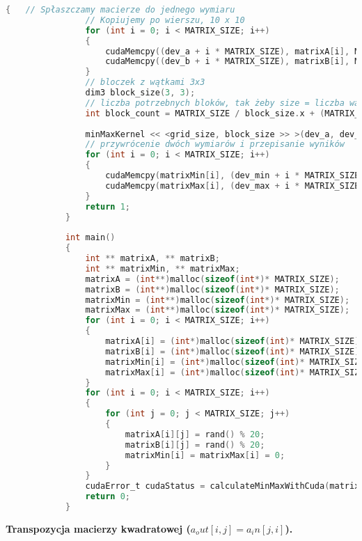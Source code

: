 			\begin{lstlisting}[language=C]
			{	// Spłaszczamy macierze do jednego wymiaru
				// Kopiujemy po wierszu, 10 x 10
				for (int i = 0; i < MATRIX_SIZE; i++)
				{
					cudaMemcpy((dev_a + i * MATRIX_SIZE), matrixA[i], MATRIX_SIZE * sizeof(int), cudaMemcpyHostToDevice);
					cudaMemcpy((dev_b + i * MATRIX_SIZE), matrixB[i], MATRIX_SIZE * sizeof(int), cudaMemcpyHostToDevice);
				}
				// bloczek z wątkami 3x3
				dim3 block_size(3, 3);
				// liczba potrzebnych bloków, tak żeby size = liczba wątków
				int block_count = MATRIX_SIZE / block_size.x + (MATRIX_SIZE % block_size.x == 0 ? 0 : 1);
				
				minMaxKernel << <grid_size, block_size >> >(dev_a, dev_b, dev_min, dev_max);
				// przywrócenie dwóch wymiarów i przepisanie wyników
				for (int i = 0; i < MATRIX_SIZE; i++)
				{
					cudaMemcpy(matrixMin[i], (dev_min + i * MATRIX_SIZE), MATRIX_SIZE * sizeof(int), cudaMemcpyDeviceToHost);
					cudaMemcpy(matrixMax[i], (dev_max + i * MATRIX_SIZE), MATRIX_SIZE * sizeof(int), cudaMemcpyDeviceToHost);
				}
				return 1;
			}
			
			int main()
			{
				int ** matrixA, ** matrixB;
				int ** matrixMin, ** matrixMax;
				matrixA = (int**)malloc(sizeof(int*)* MATRIX_SIZE);
				matrixB = (int**)malloc(sizeof(int*)* MATRIX_SIZE);
				matrixMin = (int**)malloc(sizeof(int*)* MATRIX_SIZE);
				matrixMax = (int**)malloc(sizeof(int*)* MATRIX_SIZE);
				for (int i = 0; i < MATRIX_SIZE; i++)
				{
					matrixA[i] = (int*)malloc(sizeof(int)* MATRIX_SIZE);
					matrixB[i] = (int*)malloc(sizeof(int)* MATRIX_SIZE);
					matrixMin[i] = (int*)malloc(sizeof(int)* MATRIX_SIZE);
					matrixMax[i] = (int*)malloc(sizeof(int)* MATRIX_SIZE);
				}
				for (int i = 0; i < MATRIX_SIZE; i++)
				{
					for (int j = 0; j < MATRIX_SIZE; j++)
					{
						matrixA[i][j] = rand() % 20;
						matrixB[i][j] = rand() % 20;
						matrixMin[i] = matrixMax[i] = 0;
					}
				}
				cudaError_t cudaStatus = calculateMinMaxWithCuda(matrixA, matrixB, matrixMin, matrixMax);
				return 0;
			}
		\end{lstlisting}
		\textbf{Transpozycja macierzy kwadratowej ($ a_out[ i,j ] = a_in [ j,i ] $).}
